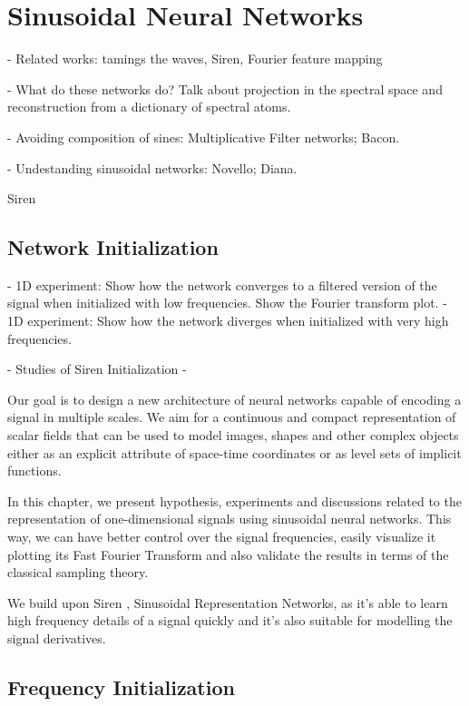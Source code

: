 \section{Sinusoidal Neural Networks}

- Related works: tamings the waves, Siren, Fourier feature mapping

- What do these networks do? Talk about projection in the spectral space and reconstruction from a dictionary of spectral atoms.

- Avoiding composition of sines: Multiplicative Filter networks; Bacon.

- Undestanding sinusoidal networks: Novello; Diana.


Siren \cite{sitzmann2019siren} 


\subsection{Network Initialization}

- 1D experiment: Show how the network converges to a filtered version of the signal when initialized with low frequencies. Show the Fourier transform plot.
- 1D experiment: Show how the network diverges when initialized with very high frequencies.

- Studies of Siren Initialization
- 


Our goal is to design a new architecture of neural networks capable of encoding a signal in multiple scales. We aim for a continuous and compact representation of scalar fields that can be used to model images, shapes and other complex objects either as an explicit attribute of space-time coordinates or as level sets of implicit functions.

In this chapter, we present hypothesis, experiments and discussions related to the representation of one-dimensional signals using sinusoidal neural networks. This way, we can have better control over the signal frequencies, easily visualize it plotting its Fast Fourier Transform and also validate the results in terms of the classical sampling theory. 

We build upon Siren \cite{sitzmann2019siren}, Sinusoidal Representation Networks, as it's able to learn high frequency details of a signal quickly and it's also suitable for modelling the signal derivatives.

\subsection{Frequency Initialization}

